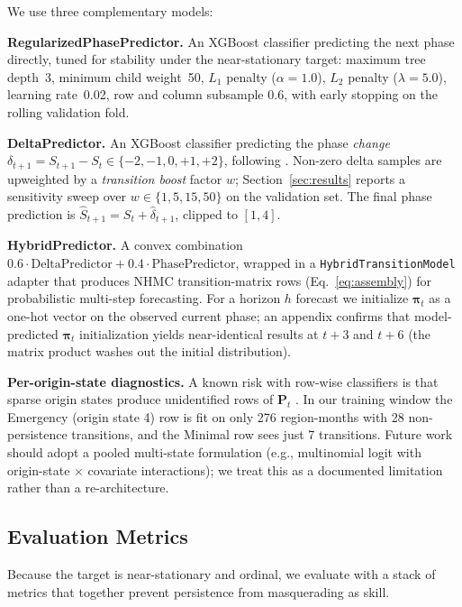 \documentclass[11pt,letterpaper]{article}
\begin{document}
We use three complementary models:

\textbf{RegularizedPhasePredictor.} An XGBoost classifier predicting the next phase directly, tuned for stability under the near-stationary target: maximum tree depth~3, minimum child weight~50, $L_1$ penalty ($\alpha = 1.0$), $L_2$ penalty ($\lambda = 5.0$), learning rate~0.02, row and column subsample $0.6$, with early stopping on the rolling validation fold.

\textbf{DeltaPredictor.} An XGBoost classifier predicting the phase \emph{change} $\delta_{t+1} = S_{t+1} - S_t \in \{-2, -1, 0, +1, +2\}$, following \citet{westerveld2021}. Non-zero delta samples are upweighted by a \emph{transition boost} factor $w$; Section~\ref{sec:results} reports a sensitivity sweep over $w \in \{1, 5, 15, 50\}$ on the validation set. The final phase prediction is $\hat{S}_{t+1} = S_t + \hat{\delta}_{t+1}$, clipped to $[1, 4]$.

\textbf{HybridPredictor.} A convex combination $0.6 \cdot \text{DeltaPredictor} + 0.4 \cdot \text{PhasePredictor}$, wrapped in a \texttt{HybridTransitionModel} adapter that produces NHMC transition-matrix rows (Eq.~\ref{eq:assembly}) for probabilistic multi-step forecasting. For a horizon $h$ forecast we initialize $\boldsymbol{\pi}_t$ as a one-hot vector on the observed current phase; an appendix confirms that model-predicted $\boldsymbol{\pi}_t$ initialization yields near-identical results at $t\!+\!3$ and $t\!+\!6$ (the matrix product washes out the initial distribution).

\textbf{Per-origin-state diagnostics.} A known risk with row-wise classifiers is that sparse origin states produce unidentified rows of $\mathbf{P}_t$ \citep{bartolucci2019}. In our training window the Emergency (origin state 4) row is fit on only 276 region-months with 28 non-persistence transitions, and the Minimal row sees just 7 transitions. Future work should adopt a pooled multi-state formulation (e.g., multinomial logit with origin-state $\times$ covariate interactions); we treat this as a documented limitation rather than a re-architecture.

\subsection{Evaluation Metrics}\label{sec:metrics}

Because the target is near-stationary and ordinal, we evaluate with a stack of metrics that together prevent persistence from masquerading as skill.
\end{document}
